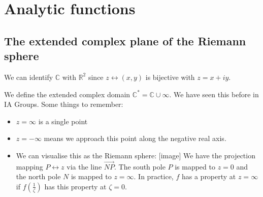 \documentclass[a4paper]{scrartcl}
\begin{document}
\section{Analytic functions}
\subsection{The extended complex plane of the Riemann sphere}
We can identify $\mathbb{C}$ with $\mathbb{R}^2$ since $z \leftrightarrow (x,y)$ is bijective with $z=x+iy$.
\begin{definition}
     We define the extended complex domain $\mathbb{C}^*=\mathbb{C}\cup \infty$. We have seen this before in IA Groups. Some things to remember: 
     \begin{itemize}
          \item $z= \infty$ is a single point
          \item $z=- \infty$ means we approach this point along the negative real axis. 
          \item We can visualise this as the Riemann sphere: [image] We have the projection mapping $P \leftrightarrow z$ via the line $\vec{NP}$. The south pole $P$ is mapped to $z=0$ and the north pole $N$ is mapped to $z= \infty$. In practice, $f$ has a property at $z= \infty$ if $f \left(\frac{1}{\zeta}\right)$ has this property at $\zeta=0$.
     \end{itemize}
\end{definition}
\end{document}
